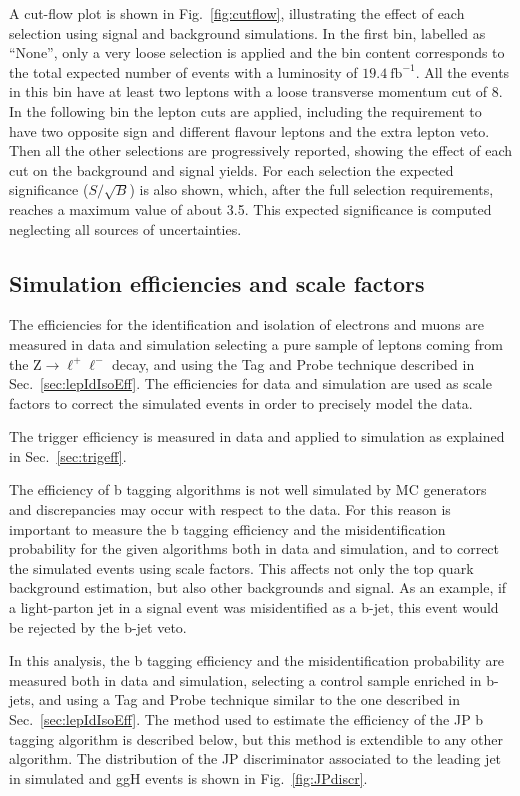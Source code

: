 A cut-flow plot is shown in Fig.~\ref{fig:cutflow}, illustrating the effect of each selection using signal and background simulations. In the first bin, labelled as ``None'', only a very loose selection is applied and the bin content corresponds to the total expected number of events with a luminosity of $19.4~\mathrm{fb}^{-1}$. All the events in this bin have at least two leptons with a loose transverse momentum cut of 8\GeV. In the following bin the lepton cuts are applied, including the requirement to have two opposite sign and different flavour leptons and the extra lepton veto. Then all the other selections are progressively reported, showing the effect of each cut on the background and signal yields. For each selection the expected significance ($S/\sqrt{B}$) is also shown, which, after the full selection requirements, reaches a maximum value of about 3.5. This expected significance is computed neglecting all sources of uncertainties.


\subsection{Simulation efficiencies and scale factors}\label{sec:ScaleFactors}
The efficiencies for the identification and isolation of electrons and muons are measured in data and simulation selecting a pure sample of leptons coming from the $\mathrm{Z\to\ell^+\ell^-}$ decay, and using the Tag and Probe technique described in Sec.~\ref{sec:lepIdIsoEff}. The efficiencies for data and simulation are used as scale factors to correct the simulated events in order to precisely model the data.

The trigger efficiency is measured in data and applied to simulation as explained in Sec.~\ref{sec:trigeff}.

The efficiency of b tagging algorithms is not well simulated by MC generators and discrepancies may occur with respect to the data. For this reason is important to measure the b tagging efficiency and the misidentification probability for the given algorithms both in data and simulation, and to correct the simulated events using scale factors. This affects not only the top quark background estimation, but also other backgrounds and signal. As an example, if a light-parton jet in a signal event was misidentified as a b-jet, this event would be rejected by the b-jet veto.

In this analysis, the b tagging efficiency and the misidentification probability are measured both in data and simulation, selecting a control sample enriched in b-jets, and using a Tag and Probe technique similar to the one described in Sec.~\ref{sec:lepIdIsoEff}. The method used to estimate the efficiency of the JP b tagging algorithm is described below, but this method is extendible to any other algorithm. The distribution of the JP discriminator associated to the leading jet in simulated \ttbar and ggH events is shown in Fig.~\ref{fig:JPdiscr}.

